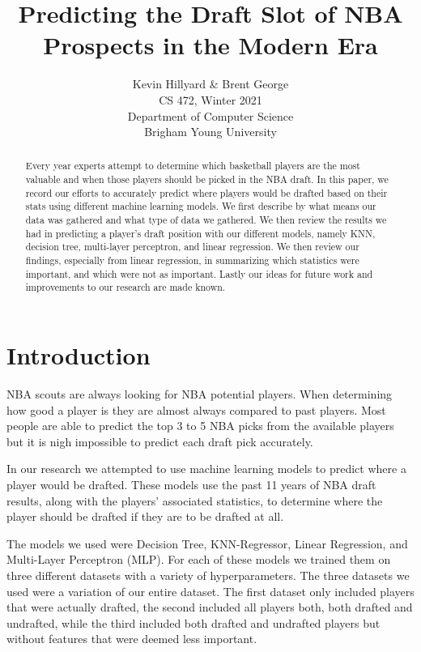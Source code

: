 \documentclass{article}
\title{Predicting the Draft Slot of NBA Prospects in the Modern Era}
\author{Kevin Hillyard \& Brent George \\
CS 472, Winter 2021 \\
Department of Computer Science\\
Brigham Young University}
\begin{document}
\maketitle

\begin{abstract}
  Every year experts attempt to determine which basketball players are the most
  valuable and when those players should be picked in the NBA draft. In this
  paper, we record our efforts to accurately predict where players would be
  drafted based on their stats using different machine learning models. We first
  describe by what means our data was gathered and what type of data we
  gathered. We then review the results we had in predicting a player’s draft
  position with our different models, namely KNN, decision tree, multi-layer
  perceptron, and linear regression. We then review our findings, especially
  from linear regression, in summarizing which statistics were important, and
  which were not as important. Lastly our ideas for future work and improvements
  to our research are made known.
\end{abstract}

\section{Introduction}

NBA scouts are always looking for NBA potential players. When determining how
good a player is they are almost always compared to past players. Most people
are able to predict the top 3 to 5 NBA picks from the available players but it
is nigh impossible to predict each draft pick accurately. 

In our research we attempted to use machine learning models to predict where a
player would be drafted. These models use the past 11 years of NBA draft
results, along with the players’ associated statistics, to determine where the
player should be drafted if they are to be drafted at all.

The models we used were Decision Tree, KNN-Regressor, Linear Regression, and
Multi-Layer Perceptron (MLP). For each of these models we trained them on three
different datasets with a variety of hyperparameters. The three datasets we used
were a variation of our entire dataset. The first dataset only included players
that were actually drafted, the second included all players both, both drafted
and undrafted, while the third included both drafted and undrafted players but
without features that were deemed less important.
\end{document}
